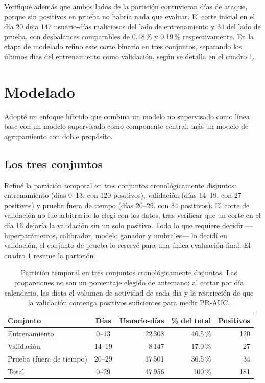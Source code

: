 \documentclass[12pt, a4paper]{article}
\begin{document}
Verifiqué además que ambos lados de la partición contuvieran días de ataque, porque sin positivos en
prueba no habría nada que evaluar. El corte inicial en el día 20 deja 147 usuario-días maliciosos del
lado de entrenamiento y 34 del lado de prueba, con desbalances comparables de 0.48\,\% y 0.19\,\%
respectivamente. En la etapa de modelado refino este corte binario en tres conjuntos, separando los
últimos días del entrenamiento como validación, según se detalla en el cuadro \ref{tab:conjuntos}.

\section{Modelado}

Adopté un enfoque híbrido que combina un modelo no supervisado como línea base con un modelo
supervisado como componente central, más un modelo de agrupamiento con doble propósito.

\subsection{Los tres conjuntos}

Refiné la partición temporal en tres conjuntos cronológicamente disjuntos: entrenamiento (días 0--13,
con 120 positivos), validación (días 14--19, con 27 positivos) y prueba fuera de tiempo (días 20--29,
con 34 positivos). El corte de validación no fue arbitrario: lo elegí con los datos, tras verificar
que un corte en el día 16 dejaría la validación sin un solo positivo. Todo lo que requiere decidir
---hiperparámetros, calibrador, modelo ganador y umbrales--- lo decidí en validación; el conjunto de
prueba lo reservé para una única evaluación final. El cuadro \ref{tab:conjuntos} resume la partición.

\begin{table}[!htb]
\centering
\small
\setlength{\tabcolsep}{6pt}
\begin{tabular}{lcrrr}
\toprule
\textbf{Conjunto} & \textbf{Días} & \textbf{Usuario-días} & \textbf{\% del total} & \textbf{Positivos} \\
\midrule
Entrenamiento & 0--13 & 22\,308 & 46.5\,\% & 120 \\
Validación & 14--19 & 8\,147 & 17.0\,\% & 27 \\
Prueba (fuera de tiempo) & 20--29 & 17\,501 & 36.5\,\% & 34 \\
\midrule
Total & 0--29 & 47\,956 & 100\,\% & 181 \\
\bottomrule
\end{tabular}
\caption{Partición temporal en tres conjuntos cronológicamente disjuntos. Las proporciones no son
un porcentaje elegido de antemano: al cortar por día calendario, las dicta el volumen de actividad
de cada día y la restricción de que la validación contenga positivos suficientes para medir PR-AUC.}
\label{tab:conjuntos}
\end{table}
\end{document}
